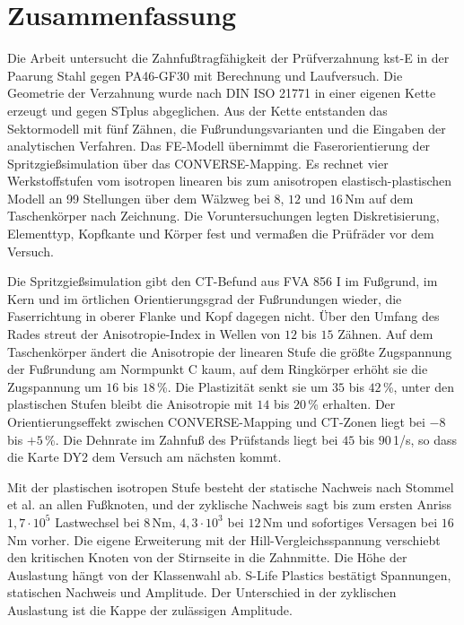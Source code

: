\section{Zusammenfassung}
\label{sec:zusammenfassung}

Die Arbeit untersucht die Zahnfußtragfähigkeit der Prüfverzahnung kst-E in der Paarung Stahl gegen PA46-GF30 mit Berechnung und Laufversuch. Die Geometrie der Verzahnung wurde nach DIN ISO 21771 in einer eigenen Kette erzeugt und gegen STplus abgeglichen. Aus der Kette entstanden das Sektormodell mit fünf Zähnen, die Fußrundungsvarianten und die Eingaben der analytischen Verfahren. Das FE-Modell übernimmt die Faserorientierung der Spritzgießsimulation über das CONVERSE-Mapping. Es rechnet vier Werkstoffstufen vom isotropen linearen bis zum anisotropen elastisch-plastischen Modell an 99 Stellungen über dem Wälzweg bei $8$, $12$ und $16$\,Nm auf dem Taschenkörper nach Zeichnung. Die Voruntersuchungen legten Diskretisierung, Elementtyp, Kopfkante und Körper fest und vermaßen die Prüfräder vor dem Versuch.

Die Spritzgießsimulation gibt den CT-Befund aus FVA 856 I im Fußgrund, im Kern und im örtlichen Orientierungsgrad der Fußrundungen wieder, die Faserrichtung in oberer Flanke und Kopf dagegen nicht. Über den Umfang des Rades streut der Anisotropie-Index in Wellen von $12$ bis $15$ Zähnen. Auf dem Taschenkörper ändert die Anisotropie der linearen Stufe die größte Zugspannung der Fußrundung am Normpunkt C kaum, auf dem Ringkörper erhöht sie die Zugspannung um $16$ bis $18$\,\%. Die Plastizität senkt sie um $35$ bis $42$\,\%, unter den plastischen Stufen bleibt die Anisotropie mit $14$ bis $20$\,\% erhalten. Der Orientierungseffekt zwischen CONVERSE-Mapping und CT-Zonen liegt bei $-8$ bis $+5$\,\%. Die Dehnrate im Zahnfuß des Prüfstands liegt bei $45$ bis $90$\,1/s, so dass die Karte DY2 dem Versuch am nächsten kommt.

Mit der plastischen isotropen Stufe besteht der statische Nachweis nach Stommel et al. an allen Fußknoten, und der zyklische Nachweis sagt bis zum ersten Anriss $1{,}7 \cdot 10^{5}$ Lastwechsel bei $8$\,Nm, $4{,}3 \cdot 10^{3}$ bei $12$\,Nm und sofortiges Versagen bei $16$\,Nm vorher. Die eigene Erweiterung mit der Hill-Vergleichs\-spannung verschiebt den kritischen Knoten von der Stirnseite in die Zahnmitte. Die Höhe der Auslastung hängt von der Klassenwahl ab. S-Life Plastics bestätigt Spannungen, statischen Nachweis und Amplitude. Der Unterschied in der zyklischen Auslastung ist die Kappe der zulässigen Amplitude.

